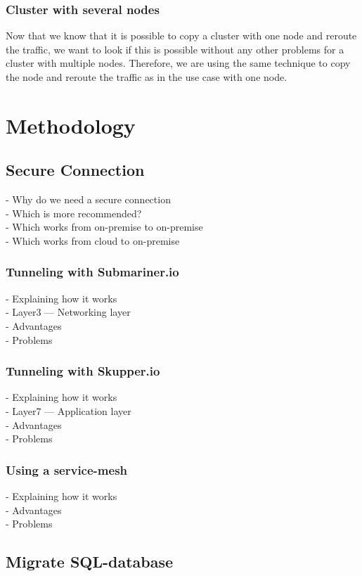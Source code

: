\subsubsection{Cluster with several nodes}
Now that we know that it is possible to copy a cluster with one node and reroute the traffic, we want to look if this is possible without any other problems for a cluster with multiple nodes. Therefore, we are using the same technique to copy the node and reroute the traffic as in the use case with one node.


%
\section{Methodology}\label{sec:methodology}
%
\subsection{Secure Connection}
- Why do we need a secure connection\\
- Which is more recommended?\\
- Which works from on-premise to on-premise\\
- Which works from cloud to on-premise\\
\subsubsection{Tunneling with Submariner.io}
- Explaining how it works\\
- Layer3 — Networking layer\\
- Advantages\\
- Problems\\
\subsubsection{Tunneling with Skupper.io}
- Explaining how it works\\
- Layer7 — Application layer\\
- Advantages\\
- Problems\\
\subsubsection{Using a service-mesh}
- Explaining how it works\\
- Advantages\\
- Problems\\

\subsection{Migrate SQL-database}
